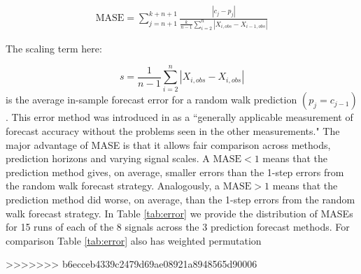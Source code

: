 \documentclass{article}
\begin{document}
\begin{align*}
  \textrm{MASE} = \sum_{j=n+1}^{k+n+1}\frac{|c_j-p_j| }{\frac{k}{n-1}\sum^n_{i=2}|X_{i,obs}-X_{i-1,obs}|}
\end{align*}

The scaling term here:


$$s=\frac{1}{n-1}\sum^n_{i=2}|X_{i,obs}-X_{i,obs}|$$ is the average in-sample
forecast error for a random walk prediction $(p_j=c_{j-1})$. This error method
was introduced in \cite{MASE} as a ``generally applicable measurement of
forecast accuracy without the problems seen in the other measurements." The
major advantage of MASE is that it allows fair comparison across methods,
prediction horizons and varying signal scales. A $\textrm{MASE}<1$ means that
the prediction method gives, on average, smaller errors than the 1-step errors
from the random walk forecast strategy. Analogously, a $\textrm{MASE}>1$ means
that the prediction method did worse, on average, than the 1-step errors from the
random walk forecast strategy. In Table \ref{tab:error} we provide the
distribution of MASEs for 15 runs of each of the 8 signals across the 3
prediction forecast methods. For comparison Table \ref{tab:error} also has
weighted permutation




>>>>>>> b6ecceb4339c2479d69ae08921a8948565d90006
\end{document}
